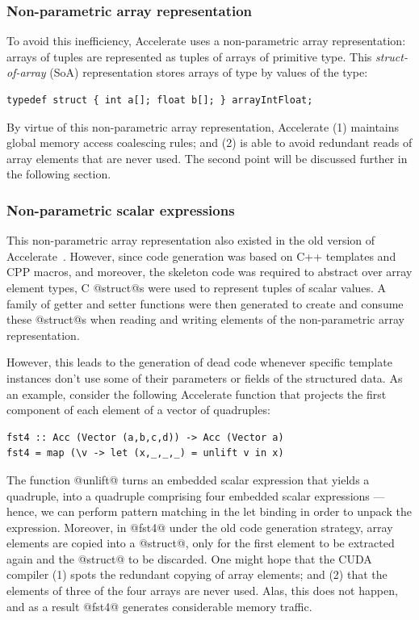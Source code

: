 \subsubsection{Non-parametric array representation}

To avoid this inefficiency, Accelerate uses a  non-parametric array representation: arrays of tuples are
represented as tuples of arrays of primitive type. This \emph{struct-of-array}
(SoA) representation stores arrays of type
 by values of the type:
%
\begin{lstlisting}[style=cuda]
typedef struct { int a[]; float b[]; } arrayIntFloat;
\end{lstlisting}
%
By virtue of this  non-parametric array
representation, Accelerate (1) maintains global memory access coalescing rules;
and (2) is able to avoid redundant reads of array elements that are never used.
The second point will be discussed further in the following section.

\subsubsection{Non-parametric scalar expressions}

This non-parametric array representation 
also existed in the old version of Accelerate~\cite{Chakravarty:2011fr}.
However, since code generation was based on C++ templates and CPP macros, and
moreover, the skeleton code was required to abstract over array element types, C
@struct@s were used to represent tuples of scalar values. A family of getter and
setter functions were then generated to create and consume these @struct@s when
reading and writing elements of the non-parametric array representation.

However, this leads to the generation of dead code whenever specific template
instances don't use some of their parameters or fields of the structured data.
As an example, consider the following Accelerate function that projects the
first component of each element of a vector of quadruples:
%
\begin{lstlisting}[style=haskell]
fst4 :: Acc (Vector (a,b,c,d)) -> Acc (Vector a)
fst4 = map (\v -> let (x,_,_,_) = unlift v in x)
\end{lstlisting}
%
The function @unlift@ turns an embedded scalar expression that yields a
quadruple, into a quadruple comprising four embedded scalar expressions ---
hence, we can perform pattern matching in the let binding in order to unpack the
expression. Moreover, in @fst4@ under the old code generation strategy,
array elements are copied into a @struct@, only for the first element to be
extracted again and the @struct@ to be discarded. One might hope that the
CUDA compiler (1) spots the redundant copying of array elements; and (2) that
the elements of three of the four arrays are never used. Alas, this does not
happen, and as a result @fst4@ generates considerable memory traffic.

